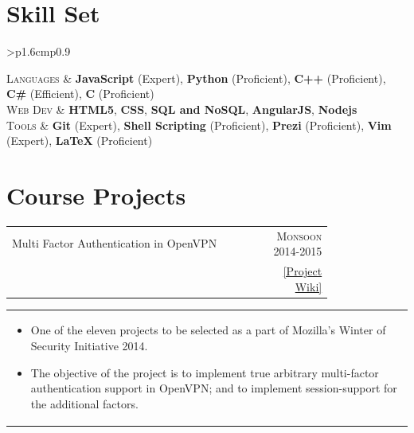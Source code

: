 \documentclass[a4paper]{article} %
\newcommand{\cproject}[5]{
    \begin{tabular}{p{0.80\linewidth}r}
        \textcolor{NavyBlue}{\small #2} & \multicolumn{1}{m{4cm}}{\raggedleft \small {\textsc{#1}}}\\
        \small {#3} & \small {#4}
    \end{tabular}
    \begin{tabular}{p{\linewidth}}
    \vspace{-0.3cm}
        \footnotesize {#5}
    \end{tabular}
    \vspace{-0.5cm}
}
\newcommand{\itemlist}[1]{
    \begin{tabular}{>{\raggedleft}p{1.6cm}p{0.9\linewidth}}
        #1
    \end{tabular}
}
\begin{document}
\section{Skill Set}

\itemlist {
    \textsc{\small Languages} %
            & \textbf{JavaScript} (Expert), \textbf{Python} (Proficient), \textbf{C++} (Proficient),
              \textbf{C\#} (Efficient), \textbf{C} (Proficient)\\
    \textsc{\small Web Dev} %
            & \textbf{HTML5}, \textbf{CSS}, \textbf{SQL and NoSQL}, \textbf{AngularJS}, \textbf{Nodejs}\\
    \textsc{\small Tools} %
            & \textbf{Git} (Expert), \textbf{Shell Scripting} (Proficient), \textbf{Prezi} (Proficient),
              \textbf{Vim} (Expert), \textbf{LaTeX} (Proficient)\\
}

\section{Course Projects}

\cproject
    {Monsoon 2014-2015}
    {Multi Factor Authentication in OpenVPN}
    {\textsc{\raggedright Mozilla Winter of Security}, Guillaume Destuynder and Professor Dheeraj Sanghi}
    {\href{https://wiki.mozilla.org/Security/Mentorships/MWoS/2014/OpenVPN\_MFA} {[Project Wiki]} }
    {
      \begin{itemize}[leftmargin=0.5cm]
          \item One of the eleven projects to be selected as a part of Mozilla's Winter of Security Initiative 2014.
          \item The objective of the project is to implement true arbitrary multi-factor authentication support in
              OpenVPN; and to implement session-support for the additional factors.
      \end{itemize}
    }
\end{document}
